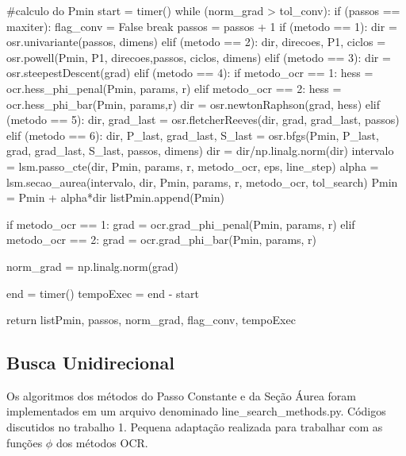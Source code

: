 \documentclass[10pt, a4paper]{article}
\begin{document}
\begin{python}
      #calculo do Pmin
      start = timer()
      while (norm_grad > tol_conv):
          if (passos == maxiter):
              flag_conv = False
              break
          passos = passos + 1
          if (metodo == 1):
              dir = osr.univariante(passos, dimens)
          elif (metodo == 2):
              dir, direcoes, P1, ciclos = osr.powell(Pmin, P1, direcoes,passos, ciclos, dimens)
          elif (metodo == 3):
              dir = osr.steepestDescent(grad)
          elif (metodo == 4):
              if metodo_ocr == 1:
                  hess = ocr.hess_phi_penal(Pmin, params, r)
              elif metodo_ocr == 2:
                  hess = ocr.hess_phi_bar(Pmin, params,r)
              dir = osr.newtonRaphson(grad, hess)
          elif (metodo == 5):
              dir, grad_last = osr.fletcherReeves(dir, grad, grad_last, passos)
          elif (metodo == 6):
              dir, P_last, grad_last, S_last = osr.bfgs(Pmin, P_last, grad, grad_last, S_last, passos, dimens)
          dir = dir/np.linalg.norm(dir)
          intervalo = lsm.passo_cte(dir, Pmin, params, r, metodo_ocr, eps, line_step)
          alpha = lsm.secao_aurea(intervalo, dir, Pmin, params, r, metodo_ocr, tol_search)
          Pmin = Pmin + alpha*dir
          listPmin.append(Pmin)
          
          
          if metodo_ocr == 1:
              grad = ocr.grad_phi_penal(Pmin, params, r)
          elif metodo_ocr == 2:
              grad = ocr.grad_phi_bar(Pmin, params, r)
              
          norm_grad = np.linalg.norm(grad)
          
      end = timer()
      tempoExec = end - start
      
      return listPmin, passos, norm_grad, flag_conv, tempoExec
\end{python}


\subsection{Busca Unidirecional}

Os algoritmos dos métodos do Passo Constante e da Seção Áurea foram implementados em um arquivo denominado line\_search\_methods.py.
Códigos discutidos no trabalho 1. Pequena adaptação realizada para trabalhar com as funções $\phi$ dos métodos OCR.
\end{document}
